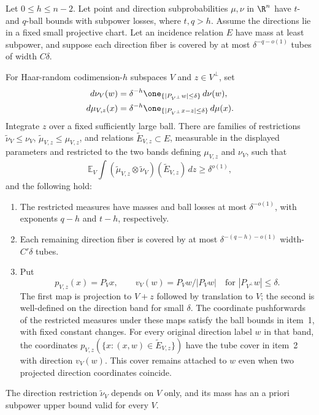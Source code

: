 \begin{lemma}\label{ang:slice-selection}
Let $0\le h\le n-2$. Let point and direction subprobabilities $\mu,\nu$ in $\R^n$ have
$t$- and $q$-ball bounds with subpower losses, where $t,q>h$.
Assume the directions lie in a fixed small projective chart. Let an
incidence relation $E$ have mass at least subpower, and suppose each
direction fiber is covered by at most $\delta^{-q-o(1)}$ tubes of
width $C\delta$.

For Haar-random codimension-$h$ subspaces $V$ and
$z\in V^\perp$, set
\begin{align*}
 d\nu_V(w)&=\delta^{-h}\one_{\{|P_{V^\perp}w|\le\delta\}}\,d\nu(w),\\
 d\mu_{V,z}(x)&=\delta^{-h}
       \one_{\{|P_{V^\perp}x-z|\le\delta\}}\,d\mu(x).
\end{align*}
Integrate $z$ over a fixed sufficiently large ball. There are families of restrictions
$\widetilde\nu_V\le\nu_V$, $\widetilde\mu_{V,z}\le\mu_{V,z}$,
and relations $\widetilde E_{V,z}\subset E$, measurable in the displayed
parameters and restricted to the two bands defining $\mu_{V,z}$ and
$\nu_V$, such that
\[
 \mathbb E_V\int
 (\widetilde\mu_{V,z}\otimes\widetilde\nu_V)(\widetilde E_{V,z})\,dz
 \ge\delta^{o(1)},
\]
and the following hold:
\begin{enumerate}
\item The restricted measures have masses and ball losses at most
$\delta^{-o(1)}$, with exponents $q-h$ and $t-h$, respectively.
\item Each remaining direction fiber is covered by at most
$\delta^{-(q-h)-o(1)}$ width-$C'\delta$ tubes.
\item Put
\[
 p_{V,z}(x)=P_Vx,\qquad v_V(w)=P_Vw/|P_Vw|
 \quad\text{for }|P_{V^\perp}w|\le\delta.
\]
The first map is projection to $V+z$ followed by translation to $V$;
the second is well-defined on the direction band for small $\delta$.
The coordinate pushforwards of the restricted measures under these maps
satisfy the ball bounds in item~1, with fixed constant changes. For every
original direction label $w$ in that band, the coordinates
$p_{V,z}(\{x:(x,w)\in\widetilde E_{V,z}\})$ have the tube cover in
item~2 with direction $v_V(w)$. This cover remains attached to $w$ even
when two projected direction coordinates coincide.
\end{enumerate}
The direction restriction $\widetilde\nu_V$ depends on $V$ only, and its
mass has an a priori subpower upper bound valid for every $V$.
\end{lemma}

